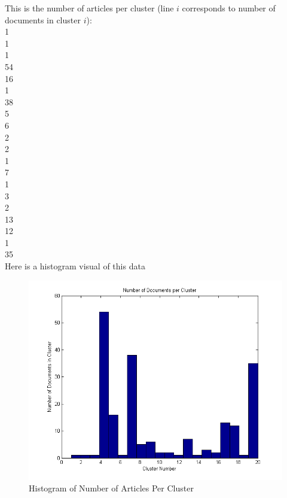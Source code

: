 \documentclass[twoside,11pt]{article}
\theoremstyle{definition}
\begin{document}
This is the number of articles per cluster (line $i$ corresponds to number of documents in cluster $i$):\\
1     \\
1     \\
1    \\
54    \\
16     \\
1    \\
38     \\
5     \\
6     \\
2     \\
2     \\
1     \\
7     \\
1     \\
3\\
2\\
13    \\
12     \\
1    \\
35\\
\newpage
Here is a histogram visual of this data

\begin{figure}[h]
\centering
\includegraphics[width=6 in]{prob2PartC.png}
\caption{Histogram of Number of Articles Per Cluster}
\end{figure}

\newpage
\end{document}
